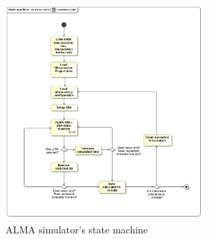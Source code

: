 \begin{figure}[h!]	
\begin{center}
\includegraphics[width=0.67\textwidth]{images/simulator-state-machine}
\end{center}
\caption{ALMA simulator's state machine}
\label{fig:sim-state-machine}
\end{figure}


